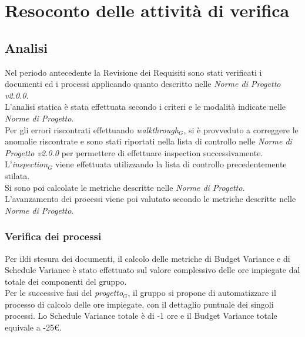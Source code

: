 \chapter{Resoconto delle attività di verifica}\label{resoconto}
\section{Analisi}\label{Analisi}
Nel periodo antecedente la Revisione dei Requisiti sono stati verificati i documenti ed i processi applicando quanto descritto nelle \textit{Norme di Progetto v2.0.0}.\\
L'analisi statica è stata effettuata secondo i criteri e le modalità indicate nelle \textit{Norme di Progetto}.\\ 
Per gli errori riscontrati effettuando \textit{walkthrough$_{G}$}, si è provveduto a correggere le anomalie riscontrate e sono stati riportati nella lista di controllo nelle \textit{Norme di Progetto v2.0.0} per permettere di effettuare inspection successivamente.\\
L'\textit{inspection$_{G}$} viene effettuata utilizzando la lista di controllo precedentemente stilata. \\
Si sono poi calcolate le metriche descritte nelle \textit{Norme di Progetto}.\\
L'avanzamento dei processi viene poi valutato secondo le metriche descritte nelle \textit{Norme di Progetto}. 
\subsection{Verifica dei processi}
Per ildi stesura dei documenti, il calcolo delle metriche di Budget Variance e di Schedule Variance è stato effettuato sul valore complessivo delle ore impiegate dal totale dei componenti del gruppo.\\
Per le successive fasi del \textit{progetto$_{G}$}, il gruppo si propone di automatizzare il processo di calcolo delle ore impiegate, con il dettaglio puntuale dei singoli processi.
Lo Schedule Variance totale è di -1 ore e il Budget Variance totale equivale a -25\euro.

\\
